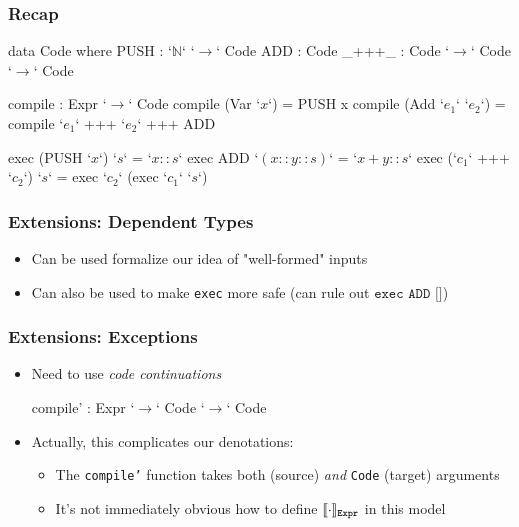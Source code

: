 \documentclass[usenames,dvipsnames]{beamer}
\newcommand{\denot}[2][]{\llbracket #2 \rrbracket_{#1}}
\newcommand{\N}{\mathbb{N}}
\begin{document}

\begin{frame}[fragile]
  \frametitle{Recap}

  \begin{code}
    data Code where
      PUSH : `$\N$` `$\rightarrow$` Code
      ADD : Code
      _+++_ : Code `$\rightarrow$` Code `$\rightarrow$` Code

    compile : Expr `$\rightarrow$` Code
    compile (Var `$x$`) = PUSH x
    compile (Add `$e_1$` `$e_2$`) = compile `$e_1$` +++ `$e_2$` +++ ADD

    exec (PUSH `$x$`) `$s$` = `$x :: s$`
    exec ADD `$(x :: y :: s)$` = `$x + y :: s$`
    exec (`$c_1$` +++ `$c_2$`) `$s$` = exec `$c_2$` (exec `$c_1$` `$s$`)
  \end{code}
\end{frame}


\begin{frame}[fragile]
  \frametitle{Extensions: Dependent Types}

  \begin{itemize}
    \item Can be used formalize our idea of "well-formed" inputs
    \item Can also be used to make \texttt{exec} more safe (can rule out
      $\texttt{exec ADD []}$)
  \end{itemize}
\end{frame}


\begin{frame}[fragile]
  \frametitle{Extensions: Exceptions}

  \begin{itemize}
    \item Need to use \emph{code continuations}
      \begin{code}
        compile' : Expr `$\rightarrow$` Code `$\rightarrow$` Code
      \end{code}

    \item Actually, this complicates our denotations:
      \begin{itemize}
        \item The \texttt{compile'} function takes both \Expr{} (source)
          \textit{and} \texttt{Code} (target) arguments

        \item It's not immediately obvious how to define $\denot[\Expr]{\cdot}$
          in this model
      \end{itemize}
  \end{itemize}
\end{frame}
\end{document}
